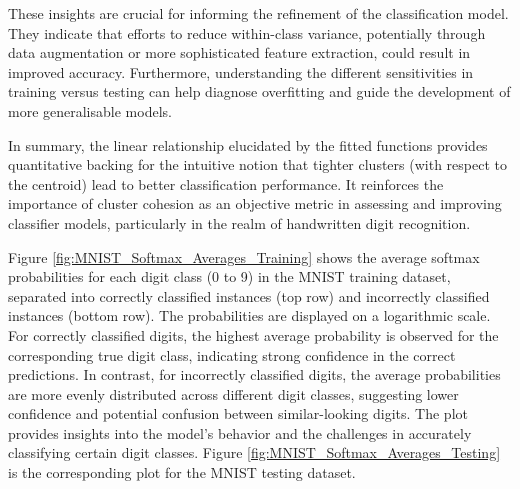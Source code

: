 

These insights are crucial for informing the refinement of the classification model. They indicate that efforts to reduce within-class variance, potentially through data augmentation or more sophisticated feature extraction, could result in improved accuracy. Furthermore, understanding the different sensitivities in training versus testing can help diagnose overfitting and guide the development of more generalisable models.

In summary, the linear relationship elucidated by the fitted functions provides quantitative backing for the intuitive notion that tighter clusters (with respect to the centroid) lead to better classification performance. It reinforces the importance of cluster cohesion as an objective metric in assessing and improving classifier models, particularly in the realm of handwritten digit recognition.


Figure \ref{fig:MNIST_Softmax_Averages_Training} shows the average softmax probabilities for each digit class (0 to 9) in the MNIST training dataset, separated into correctly classified instances (top row) and incorrectly classified instances (bottom row). The probabilities are displayed on a logarithmic scale. For correctly classified digits, the highest average probability is observed for the corresponding true digit class, indicating strong confidence in the correct predictions. In contrast, for incorrectly classified digits, the average probabilities are more evenly distributed across different digit classes, suggesting lower confidence and potential confusion between similar-looking digits. The plot provides insights into the model's behavior and the challenges in accurately classifying certain digit classes.
Figure \ref{fig:MNIST_Softmax_Averages_Testing} is the corresponding plot for the MNIST testing dataset.


